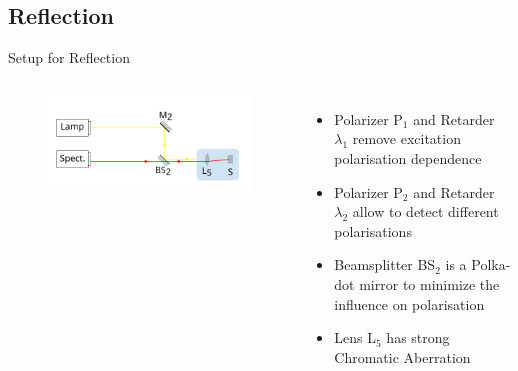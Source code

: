 \documentclass[
	10pt,
]{beamer}
\begin{document}
\subsection{Reflection}
\begin{frame}{Setup for Reflection}
	\begin{columns}
		\begin{figure}
			\centering
			\includegraphics[width=\textwidth]{../figures/setup_reflection.pdf}
		\end{figure}
		
		\begin{itemize}
			\item Polarizer {\color{seeblau}P$_1$} and Retarder {\color{seeblau}$\lambda_1$} remove excitation polarisation dependence
			\item Polarizer {\color{seeblau}P$_2$} and Retarder {\color{seeblau}$\lambda_2$} allow to detect different polarisations 
			\item Beamsplitter {\color{seeblau}BS$_2$} is a Polka-dot mirror to minimize the influence on polarisation
			\item Lens {\color{seeblau}L$_5$} has strong Chromatic Aberration
		\end{itemize}
	\end{columns}
\end{frame}
\end{document}
